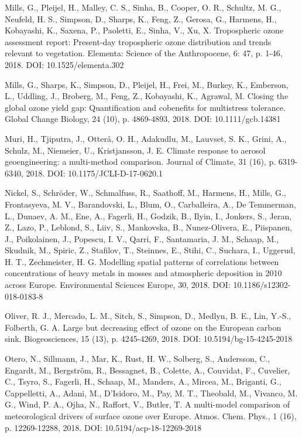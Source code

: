\begin{list}{}{\setlength{\leftmargin}{15pt}\setlength{\itemindent}{-\leftmargin}}
\item[]
Mills, G., Pleijel, H., Malley, C. S., Sinha, B., Cooper, O. R., Schultz, M. G., Neufeld, H. S., Simpson, D., Sharps, K., Feng, Z., Gerosa, G., Harmens, H., Kobayashi, K., Saxena, P., Paoletti, E., Sinha, V., Xu, X. 
Tropospheric ozone assessment report: Present-day tropospheric ozone distribution and trends relevant to vegetation. 
Elementa: Science of the Anthropocene, 6: 47, p. 1-46, 2018. 
DOI: 10.1525/elementa.302

\item[]
Mills, G., Sharps, K., Simpson, D., Pleijel, H., Frei, M., Burkey, K., Emberson, L., Uddling, J., Broberg, M., Feng, Z., Kobayashi, K., Agrawal, M. 
Closing the global ozone yield gap: Quantification and cobenefits for multistress tolerance. 
Global Change Biology, 24 (10), p. 4869-4893, 2018. 
DOI: 10.1111/gcb.14381

\item[]
Muri, H., Tjiputra, J., Otter{\aa}, O. H., Adakudlu, M., Lauvset, S. K., Grini, A., Schulz, M., Niemeier, U., Kristjansson, J. E. 
Climate response to aerosol geoengineering: a multi-method comparison. 
Journal of Climate, 31 (16), p. 6319-6340, 2018. 
DOI: 10.1175/JCLI-D-17-0620.1

\item[]
Nickel, S., Schr{\"o}der, W., Schmalfuss, R., Saathoff, M., Harmens, H., Mills, G., Frontasyeva, M. V., Barandovski, L., Blum, O., Carballeira, A., De Temmerman, L., Dunaev, A. M., Ene, A., Fagerli, H., Godzik, B., Ilyin, I., Jonkers, S., Jeran, Z., Lazo, P., Leblond, S., Liiv, S., Mankovska, B., Nunez-Olivera, E., Piispanen, J., Poikolainen, J., Popescu, I. V., Qarri, F., Santamaria, J. M., Schaap, M., Skudnik, M., Spiric, Z., Stafilov, T., Steinnes, E., Stihi, C., Suchara, I., Uggerud, H. T., Zechmeister, H. G. 
Modelling spatial patterns of correlations between concentrations of heavy metals in mosses and atmospheric deposition in 2010 across Europe. 
Environmental Sciences Europe, 30, 2018. 
DOI: 10.1186/s12302-018-0183-8

\item[]
Oliver, R. J., Mercado, L. M., Sitch, S., Simpson, D., Medlyn, B. E., Lin, Y.-S., Folberth, G. A. 
Large but decreasing effect of ozone on the European carbon sink. 
Biogeosciences, 15 (13), p. 4245-4269, 2018. 
DOI: 10.5194/bg-15-4245-2018

\item[]
Otero, N., Sillmann, J., Mar, K., Rust, H. W., Solberg, S., Andersson, C., Engardt, M., Bergstr{\"o}m, R., Bessagnet, B., Colette, A., Couvidat, F., Cuvelier, C., Tsyro, S., Fagerli, H., Schaap, M., Manders, A., Mircea, M., Briganti, G., Cappelletti, A., Adani, M., D'Isidoro, M., Pay, M. T., Theobald, M., Vivanco, M. G., Wind, P. A., Ojha, N., Raffort, V., Butler, T. 
A multi-model comparison of meteorological drivers of surface ozone over Europe. 
Atmos. Chem. Phys., 1 (16), p. 12269-12288, 2018. 
DOI: 10.5194/acp-18-12269-2018


\end{list}
